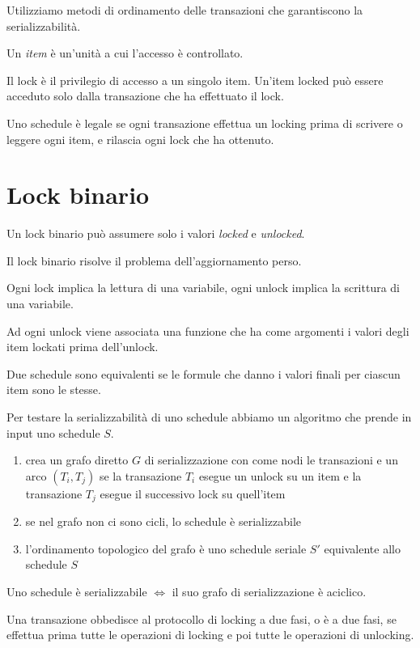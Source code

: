 Utilizziamo metodi di ordinamento delle transazioni che garantiscono la serializzabilit\`a.

Un \emph{item} \`e un'unit\`a a cui l'accesso \`e controllato.

Il lock \`e il privilegio di accesso a un singolo item. Un'item locked pu\`o essere acceduto solo dalla transazione che ha effettuato il lock.

Uno schedule \`e legale se ogni transazione effettua un locking prima di scrivere o leggere ogni item, e rilascia ogni lock che ha ottenuto.

\section{Lock binario}

Un lock binario pu\`o assumere solo i valori \emph{locked} e \emph{unlocked}.

Il lock binario risolve il problema dell'aggiornamento perso.

Ogni lock implica la lettura di una variabile, ogni unlock implica la scrittura di una variabile.

Ad ogni unlock viene associata una funzione che ha come argomenti i valori degli item lockati prima dell'unlock.

Due schedule sono equivalenti se le formule che danno i valori finali per ciascun item sono le stesse.

Per testare la serializzabilit\`a di uno schedule abbiamo un algoritmo che prende in input uno schedule $S$.

\begin{enumerate}
    \item crea un grafo diretto $G$ di serializzazione con come nodi le transazioni e un arco $(T_i, T_j)$ se la transazione $T_i$ esegue un unlock su un item e la transazione $T_j$ esegue il successivo lock su quell'item
    \item se nel grafo non ci sono cicli, lo schedule \`e serializzabile
    \item l'ordinamento topologico del grafo \`e uno schedule seriale $S'$ equivalente allo schedule $S$
\end{enumerate}

\begin{theorem}
Uno schedule \`e serializzabile $\iff$ il suo grafo di serializzazione \`e aciclico.
\end{theorem}

Una transazione obbedisce al protocollo di locking a due fasi, o \`e a due fasi, se effettua prima tutte le operazioni di locking e poi tutte le operazioni di unlocking.

